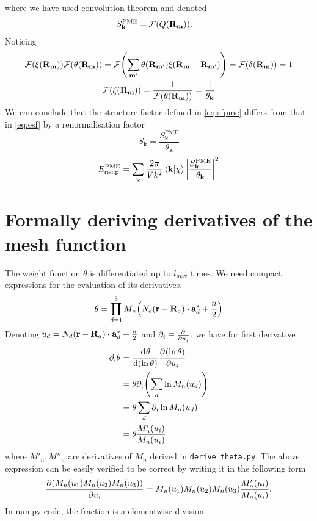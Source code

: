 \documentclass[12pt]{extarticle}
\renewcommand{\bf}{\mathbf}
\begin{document}
    where we have used convolution theorem and denoted
    \begin{align}
        S^\text{PME}_{\bf k} &=  \mathcal{F} \pqty{Q\pqty{\bf R_{\bf m}}}
        \label{eq:sfpme}.
    \end{align}
    Noticing \begin{gather*}
        \mathcal{F} \pqty{\xi\pqty{\bf R_{\bf m}}} \mathcal{F} \pqty{\theta\pqty{\bf R_{\bf m}}} = \mathcal{F} \pqty{\sum_{\bf m'} \theta(\bf R_{\bf m'}) \xi\pqty{\bf R_{\bf m} - \bf R_{\bf m'}}} = \mathcal{F} \pqty{\delta\pqty{\bf R_{\bf m}}} = 1\\
        \mathcal{F} \pqty{\xi\pqty{\bf R_{\bf m}}} = \frac{1}{ \mathcal{F} \pqty{\theta\pqty{\bf R_{\bf m}}} } = \frac{1}{\theta_{\bf k}}
    \end{gather*}
    We can conclude that the structure factor defined in \cref{eq:sfpme} differs from that in \cref{eq:esf} by a renormalisation factor \[
        S_{\bf k} =\frac{S^\text{PME}_{\bf k} }{ \theta_{\bf k}}
    \]
    \begin{equation}
        E^\text{PME}_\text{recip}= \sum_{ \bf k} \frac{2\pi}{Vk^2}  \bra{\bf k}  \ket{\chi } \abs{ \frac{S^\text{PME}_{\bf k} }{ \theta_{\bf k}}}^2 \label{eq:epme}
    \end{equation}
    \section{Formally deriving derivatives of the mesh function}
    The weight function \(\theta\) is differentiated up to \(l_\text{max}\) times. We need compact expressions for the evaluation of its derivatives. 
    \[
        \theta = \prod_{d = 1}^3 M_n \pqty{ N_d ( \mathbf r - \mathbf R_a) \dotproduct \bf a^*_d + \frac{n}{2} }
    \]
    Denoting \(u_d = N_d ( \mathbf r - \mathbf R_a) \dotproduct \bf a^*_d + \frac{n}{2} \) and \(\partial_i \equiv \pdv[]{}{u_i}\), we have for first derivative
    \begin{align*}
        \partial_i \theta &= \dv[]{\theta}{(\ln \theta)} \pdv[]{(\ln \theta)}{u_i}\\
        &= \theta \partial_i \pqty{\sum_d \ln M_n(u_d) }\\
        &= \theta \sum_d \partial_i \ln M_n(u_d) \\
        &= \theta \frac{M'_n(u_i)}{M_n(u_i)} 
    \end{align*}
    where \(M'_n, M''_n\) are derivatives of \(M_n\) derived in \texttt{derive\_theta.py}. The above expression can be easily verified to be correct by writing it in the following form \[
        \pdv{(M_n(u_1) M_n(u_2) M_n(u_3))}{u_i} = M_n(u_1) M_n(u_2) M_n(u_3) \frac{M'_n (u_i)}{M_n(u_i)}.
    \]
    In numpy code, the fraction is a elementwise division.
    
\end{document}
